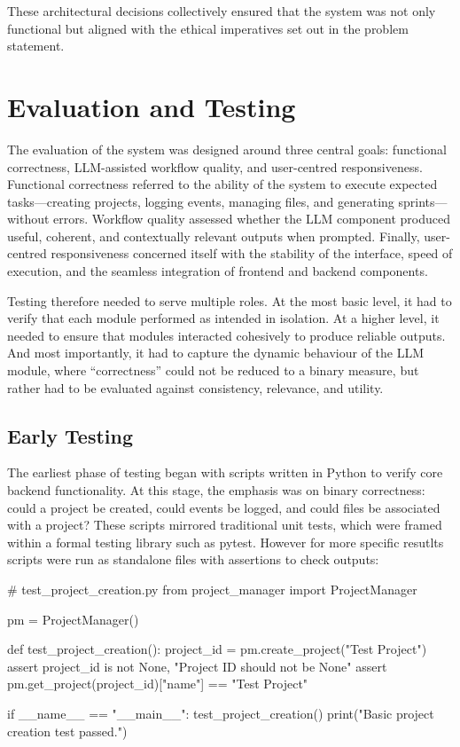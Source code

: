 \documentclass{report}
\begin{document}
These architectural decisions collectively ensured that the system was not only functional but aligned with the ethical imperatives set out in the problem statement.

\chapter{Evaluation and Testing}  
The evaluation of the system was designed around three central goals: functional correctness, LLM-assisted workflow quality, and user-centred responsiveness. 
Functional correctness referred to the ability of the system to execute expected tasks—creating projects, logging events, managing files, and generating sprints—without errors. 
Workflow quality assessed whether the LLM component produced useful, coherent, and contextually relevant outputs when prompted. 
Finally, user-centred responsiveness concerned itself with the stability of the interface, speed of execution, and the seamless integration of frontend and backend components.

Testing therefore needed to serve multiple roles. At the most basic level, it had to verify that each module performed as intended in isolation. 
At a higher level, it needed to ensure that modules interacted cohesively to produce reliable outputs. 
And most importantly, it had to capture the dynamic behaviour of the LLM module, where “correctness” could not be reduced to a binary measure, but rather had to be evaluated against consistency, relevance, and utility.

\section{Early Testing}

The earliest phase of testing began with scripts written in Python to verify core backend functionality. 
At this stage, the emphasis was on binary correctness: could a project be created, could events be logged, and could files be associated with a project? 
These scripts mirrored traditional unit tests, which were framed within a formal testing library such as pytest. 
However for more specific resutlts scripts were run as standalone files with assertions to check outputs:

\begin{python}
    # test_project_creation.py
from project_manager import ProjectManager

pm = ProjectManager()

def test_project_creation():
    project_id = pm.create_project("Test Project")
    assert project_id is not None, "Project ID should not be None"
    assert pm.get_project(project_id)["name"] == "Test Project"

if __name__ == "__main__":
    test_project_creation()
    print("Basic project creation test passed.")
\end{python}
\end{document}
